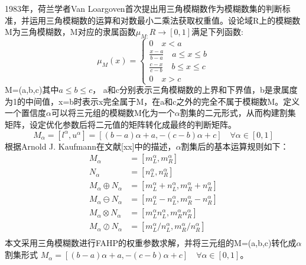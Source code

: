1983年，荷兰学者Van Loargoven首次提出用三角模糊数作为模糊数集的判断标准，并运用三角模糊数的运算和对数最小二乘法获取权重值。设论域R上的模糊数M为三角模糊数，M对应的隶属函数\begin{math}\mu_{M:}R\to[0,1]\end{math}满足下列函数:
\begin{equation}
\mu_{M}(x) = \left\{\begin{array}{l}
0 \quad x<a \\ [0.3cm]
\frac{x-a}{b-a} \quad a\le x\le b \\ [0.2cm]
\frac{c-x}{c-b} \quad b\le x\le c \\ [0.2cm]
0 \quad x>c
\end{array}\right.
\end{equation}
M=(a,b,c)其中\begin{math}a\le b\le c\end{math}，
a和c分别表示三角模糊数的上界和下界值，b是隶属度为1的中间值，x=b时表示x完全属于M，在a和c之外的完全不属于模糊数M。定义一个置信度\begin{math}\alpha\end{math}可以将三元组的模糊数M化为一个\begin{math}\alpha\end{math}割集的二元形式，从而构建割集矩阵，设定优化参数后将二元值的矩阵转化成最终的判断矩阵。
\begin{equation}
	M_{\alpha} = [l^{\alpha},u^{\alpha}]=[(b-a)\alpha+a,-(c-b)\alpha+c] \quad \forall \alpha\in[0,1]
\end{equation}
根据Arnold J. Kaufmann在文献[xx]中的描述，\begin{math}\alpha\end{math}割集后的基本运算规则如下：
\begin{equation}
\begin{split}
	M_{\alpha} &= [m_{L}^{\alpha},m_{R}^{\alpha}] \\[0.2cm]
	N_{\alpha} &= [n_{L}^{\alpha},n_{R}^{\alpha}] \\[0.2cm]
	M_{\alpha}\oplus N_{\alpha} &= [m_{L}^{\alpha}+n_{L}^{\alpha},m_{R}^{\alpha}+n_{R}^{\alpha}] \\[0.2cm]
	M_{\alpha}\ominus N_{\alpha} &= [m_{L}^{\alpha}-n_{L}^{\alpha},m_{R}^{\alpha}-n_{R}^{\alpha}] \\[0.2cm]
	M_{\alpha}\otimes N_{\alpha} &= [m_{L}^{\alpha}n_{L}^{\alpha},m_{R}^{\alpha}n_{R}^{\alpha}] \\[0.2cm]
	M_{\alpha}\oslash N_{\alpha} &= [m_{L}^{\alpha}/n_{L}^{\alpha},m_{R}^{\alpha}/n_{R}^{\alpha}] \\[0.2cm]
	\end{split}
\end{equation}
本文采用三角模糊数进行FAHP的权重参数求解，并将三元组的M=(a,b,c)转化成\begin{math}\alpha\end{math}割集形式
\begin{math}M_{\alpha} =[(b-a)\alpha+a,-(c-b)\alpha+c] \quad \forall \alpha\in[0,1]\end{math}。

